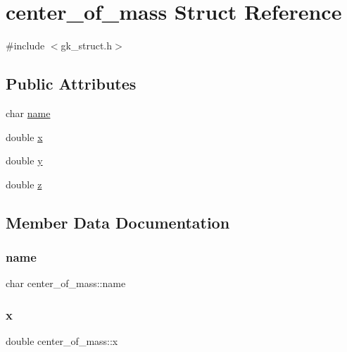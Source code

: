 \hypertarget{a00662}{}\section{center\+\_\+of\+\_\+mass Struct Reference}
\label{a00662}


{\ttfamily \#include $<$gk\+\_\+struct.\+h$>$}

\subsection*{Public Attributes}
\begin{DoxyCompactItemize}
\item 
char \hyperlink{a00662_a2248bac029694a6037c963fe7ffa125c}{name}
\item 
double \hyperlink{a00662_a8b780ea11a3eeab420eca264d8bb7a44}{x}
\item 
double \hyperlink{a00662_a3e8fe055fd621185274f30f256830d90}{y}
\item 
double \hyperlink{a00662_a7dc0bfbcd0169218cefa37050731df2e}{z}
\end{DoxyCompactItemize}


\subsection{Member Data Documentation}
\mbox{\label{a00662_a2248bac029694a6037c963fe7ffa125c}} 
\subsubsection{\texorpdfstring{name}{name}}
{\footnotesize\ttfamily char center\+\_\+of\+\_\+mass\+::name}

\mbox{\label{a00662_a8b780ea11a3eeab420eca264d8bb7a44}} 
\subsubsection{\texorpdfstring{x}{x}}
{\footnotesize\ttfamily double center\+\_\+of\+\_\+mass\+::x}

\mbox{\label{a00662_a3e8fe055fd621185274f30f256830d90}} 
